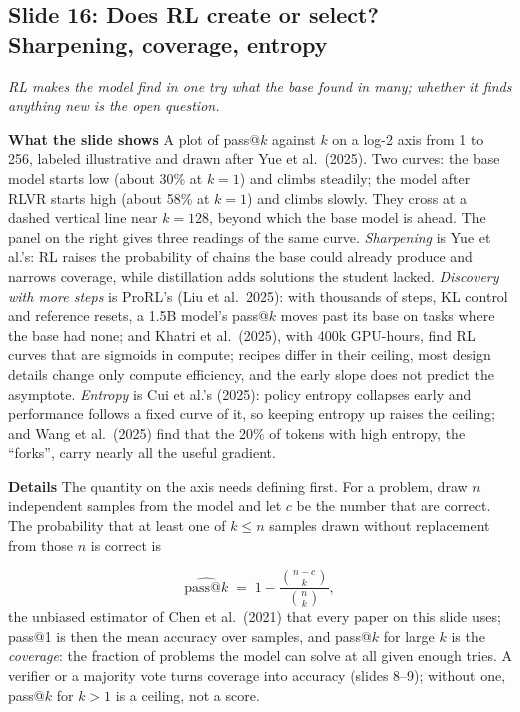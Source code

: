 \documentclass[11pt,letterpaper]{article}
\makeatletter
\newcommand{\slide}[3]{%
  \subsection[Slide #1: #2]{Slide #1: #2}%
  {\color{muted}\itshape #3\par}\medskip}
\newcommand{\para}[1]{\medskip\noindent\textbf{#1}\quad}
\newenvironment{formulas}{\begin{tcolorbox}[formulabox]}{\end{tcolorbox}}
\newcommand{\passk}{\mathrm{pass}@k}
\makeatother
\begin{document}
\slide{16}{Does RL create or select? Sharpening, coverage, entropy}{RL makes the model find in one try what the base found in many; whether it finds anything new is the open question.}

\para{What the slide shows} A plot of pass@$k$ against $k$ on a log-2 axis from 1 to 256, labeled illustrative and drawn after Yue et al.\ (2025). Two curves: the base model starts low (about 30\% at $k=1$) and climbs steadily; the model after RLVR starts high (about 58\% at $k=1$) and climbs slowly. They cross at a dashed vertical line near $k=128$, beyond which the base model is ahead. The panel on the right gives three readings of the same curve. \emph{Sharpening} is Yue et al.'s: RL raises the probability of chains the base could already produce and narrows coverage, while distillation adds solutions the student lacked. \emph{Discovery with more steps} is ProRL's (Liu et al.\ 2025): with thousands of steps, KL control and reference resets, a 1.5B model's pass@$k$ moves past its base on tasks where the base had none; and Khatri et al.\ (2025), with 400k GPU-hours, find RL curves that are sigmoids in compute; recipes differ in their ceiling, most design details change only compute efficiency, and the early slope does not predict the asymptote. \emph{Entropy} is Cui et al.'s (2025): policy entropy collapses early and performance follows a fixed curve of it, so keeping entropy up raises the ceiling; and Wang et al.\ (2025) find that the 20\% of tokens with high entropy, the ``forks'', carry nearly all the useful gradient.

\para{Details} The quantity on the axis needs defining first. For a problem, draw $n$ independent samples from the model and let $c$ be the number that are correct. The probability that at least one of $k\le n$ samples drawn without replacement from those $n$ is correct is
\begin{formulas}
\[
\widehat{\passk}\;=\;1-\frac{\binom{n-c}{k}}{\binom{n}{k}},
\]
the unbiased estimator of Chen et al.\ (2021) that every paper on this slide uses; pass@1 is then the mean accuracy over samples, and pass@$k$ for large $k$ is the \emph{coverage}: the fraction of problems the model can solve at all given enough tries. A verifier or a majority vote turns coverage into accuracy (slides 8--9); without one, pass@$k$ for $k>1$ is a ceiling, not a score.
\end{formulas}
\end{document}
